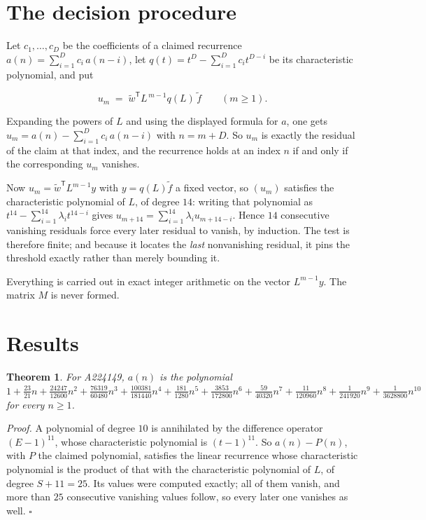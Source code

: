 \documentclass[11pt]{article}
\newtheorem{theorem}{Theorem}
\theoremstyle{definition}
\begin{document}
\section{The decision procedure}

Let $c_1,\dots,c_D$ be the coefficients of a claimed recurrence $a(n) = \sum_{i=1}^{D} c_i\,a(n-i)$, let $q(t) = t^{D} - \sum_{i=1}^{D} c_i t^{D-i}$ be its characteristic polynomial, and put

\[u_m \;=\; \tilde w^{\mathsf T} L^{\,m-1} q(L)\,\tilde f \qquad (m \ge 1).\]

Expanding the powers of $L$ and using the displayed formula for $a$, one gets $u_m = a(n) - \sum_{i=1}^{D} c_i\,a(n-i)$ with $n = m + D$. So $u_m$ is exactly the residual of the claim at that index, and the recurrence holds at an index $n$ if and only if the corresponding $u_m$ vanishes.

Now $u_m = \tilde w^{\mathsf T} L^{m-1} y$ with $y = q(L)\tilde f$ a fixed vector, so $(u_m)$ satisfies the characteristic polynomial of $L$, of degree $14$: writing that polynomial as $t^{14} - \sum_{i=1}^{14} \lambda_i t^{14-i}$ gives $u_{m+14} = \sum_{i=1}^{14} \lambda_i u_{m+14-i}$. Hence $14$ consecutive vanishing residuals force every later residual to vanish, by induction. The test is therefore finite; and because it locates the {\itshape last} nonvanishing residual, it pins the threshold exactly rather than merely bounding it.

Everything is carried out in exact integer arithmetic on the vector $L^{m-1}y$. The matrix $M$ is never formed.

\section{Results}

\begin{theorem} For A224149, $a(n)$ is the polynomial $1 + \frac{23}{21}n + \frac{24247}{12600}n^{2} + \frac{76319}{60480}n^{3} + \frac{100381}{181440}n^{4} + \frac{181}{1280}n^{5} + \frac{3853}{172800}n^{6} + \frac{59}{40320}n^{7} + \frac{11}{120960}n^{8} + \frac{1}{241920}n^{9} + \frac{1}{3628800}n^{10}$ for every $n \ge 1$.\end{theorem}

{\itshape Proof.} A polynomial of degree $10$ is annihilated by the difference operator $(E-1)^{11}$, whose characteristic polynomial is $(t-1)^{11}$. So $a(n) - P(n)$, with $P$ the claimed polynomial, satisfies the linear recurrence whose characteristic polynomial is the product of that with the characteristic polynomial of $L$, of degree $S + 11 = 25$. Its values were computed exactly; all of them vanish, and more than $25$ consecutive vanishing values follow, so every later one vanishes as well. $\square$
\end{document}
